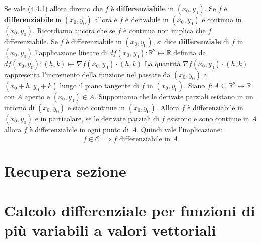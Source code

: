 \documentclass[a4paper]{article}
\numberwithin{equation}{subsection}
\begin{document}
\dfn{}
{
    Se vale (4.4.1) allora diremo che $f$ è \textbf{differenziabile} in $(x_0,y_0)$.
}
\noindent
Se $f$ è \textbf{differenziabile} in $(x_0,y_0)$ allora è $f$ è derivabile in $(x_0,y_0)$ e continua in $(x_0,y_0)$.
Ricordiamo ancora che se $f$ è continua non implica che $f$ differenziabile. 
\dfn{}
{
    Se $f$ è differenziabile in $(x_0,y_0)$, si dice \textbf{differenziale} di $f$ in $(x_0,y_0)$ l'applicazione lineare di $df(x_0,y_0) : \mathbb{R}^2 \mapsto \mathbb{R}$ definita da $df(x_0,y_0) : (h,k) \mapsto \nabla f(x_0,y_0) \cdot (h,k)$
}
La quantità $\nabla f(x_0,y_0) \cdot (h,k)$ rappresenta l'incremento della funzione nel passare da $(x_0,y_0)$ a $(x_0 + h, y_0 + k)$ lungo il piano tangente di $f$ in $(x_0,y_0)$.
\thm{}
{
    Siano $f : A \subseteq \mathbb{R}^2 \mapsto \mathbb{R}$ con $A$ aperto e $(x_0,y_0) \in A$. Supponiamo che le derivate parziali esistano in un intorno di $(x_0,y_0)$ e siano continue in $(x_0,y_0)$. Allora $f$ è differenziabile in $(x_0,y_0)$ e in particolare,
    se le derivate parziali di $f$ esistono e sono continue in $A$ allora $f$ è differenziabile in ogni punto di $A$. Quindi vale l'implicazione:
    \[f \in \mathcal{C}^1 \Longrightarrow f \text{ differenziabile in } A\]
}

\section{Recupera sezione}

\pagebreak

\section{Calcolo differenziale per funzioni di più variabili a valori vettoriali}
\end{document}
